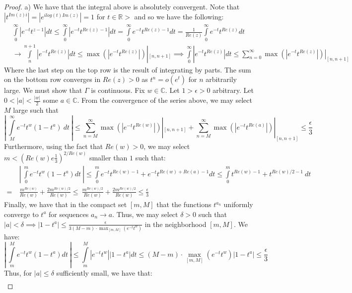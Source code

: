 \documentclass{article}
\newcommand{\bb}[1]{\mathbb{#1}}
\begin{document}
\begin{proof}
  a) We have that the integral above is absolutely convergent. Note that $|t^{Im(z)i}| = |e^{ilog(t)Im(z)}| = 1$ for $t \in \bb{R}>$ and so we have the following:
  \begin{align*}
   & \int\limits_{0}^{\infty}|e^{-t}t^{z-1}| dt  \leq \int\limits_{0}^{\infty}|e^{-t}t^{Re(z) -1}| dt = \int\limits_{0}^{\infty}e^{-t}t^{Re(z) -1} dt = \frac{1}{Re(z)}\int\limits_{0}^{\infty}e^{-t}t^{Re(z)}dt\\
    & \rightarrow \int\limits_{n}^{n+1}|e^{-t}t^{Re(z)}|dt \leq \max(|e^{-t}t^{Re(z)}|)|_{[n,n+1]} \implies \int\limits_{0}^{\infty}|e^{-t}t^{Re(z)}|dt \leq \sum_{n=0}^{\infty}\max(|e^{-t}t^{Re(z)}|)|_{[n,n+1]}
  \end{align*}
  Where the last step on the top row is the result of integrating by parts. The sum on the bottom row converges in $Re(z) > 0$ as $t^{n} = o(e^{t})$ for $n$ arbitrarily large. We must show that $\Gamma$ is continuous. Fix $w\in \bb{C}$. Let $1> \epsilon > 0$ arbitrary. Let $0<|a|<\frac{|w|}{2}$ some $a \in \bb{C}$. From the convergence of the series above, we may select $M$ large such that
  \[
  \left| \ \int\limits_{M}^{\infty}e^{-t}t^{w}(1-t^{a}) \ dt \ \right|\leq \sum_{n=M}^{\infty}\max(|e^{-t}t^{Re(w)}|)|_{[n,n+1]} + \sum_{n=M}^{\infty}\max(|e^{-t}t^{Re(a)}|)|_{[n,n+1]} \leq \frac{\epsilon}{3} 
\]
Furthermore, using the fact that $Re(w) > 0$, we may select $m < (Re(w)e \frac{1}{3})^{2/Re(w)}$ smaller than $1$ such that:
\begin{align*}
  & \left|\ \int\limits_{0}^{m}e^{-t}t^{w}(1-t^{a})dt \ \right| \leq \int\limits_{0}^{m}e^{-t}t^{Re(w)-1} + e^{-t}t^{Re(w) + Re(a)-1} dt \leq \int\limits_{0}^{m}t^{Re(w)-1} + t^{Re(w)/2 -1} \ dt \\ = \ &\frac{m^{Re(w)}}{Re(w)} + \frac{2m^{Re(w)/2}}{Re(w)}
  \leq \  \frac{m^{Re(w)/2}}{Re(w)} + \frac{2m^{Re(w)/2}}{Re(w)} \leq \frac{\epsilon}{3}
\end{align*}
Finally, we have that in the compact set $[m,M]$ that the functions $t^{a_{n}}$ uniformly converge to $t^{a}$ for sequences $a_{n} \to a$. Thus, we may select $\delta > 0$ such that $|a| < \delta \implies |1-t^{a}| \leq \frac{\epsilon}{3(M-m)\cdot\max_{[m,M]}(e^{-t}t^{w})}$ in the neighborhood $[m,M]$. We have:
\[
  \left| \ \int\limits_{m}^{M}e^{-t}t^{w}(1-t^{a}) dt \ \right| \leq \int\limits_{m}^{M}|e^{-t}t^{w}||1-t^{a}| dt \leq (M-m)\cdot\max_{[m,M]}(e^{-t}t^{w})|1-t^{a}| \leq \frac{\epsilon}{3} 
  \]
  Thus, for $|a| \leq \delta$ sufficiently small, we have that:
  \begin{align*}

\end{align*}
\end{proof}
\end{document}
